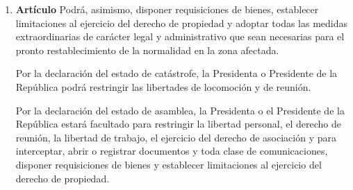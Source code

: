 \documentclass[11pt, a4paper]{article}
\begin{document}
\begin{enumerate}
\item \textbf{Artículo} \newline
Podrá, asimismo, disponer requisiciones de bienes, establecer limitaciones al ejercicio del derecho de propiedad y adoptar todas las medidas extraordinarias de carácter legal y administrativo que sean necesarias para el pronto restablecimiento de la normalidad en la zona afectada. 

Por la declaración del estado de catástrofe, la Presidenta o Presidente de la República podrá restringir las libertades de locomoción y de reunión. 

Por la declaración del estado de asamblea, la Presidenta o el Presidente de la República estará facultado para restringir la libertad personal, el derecho de reunión, la libertad de trabajo, el ejercicio del derecho de asociación y para interceptar, abrir o registrar documentos y toda clase de comunicaciones, disponer requisiciones de bienes y establecer limitaciones al ejercicio del derecho de propiedad. 


\end{enumerate}
\end{document}
